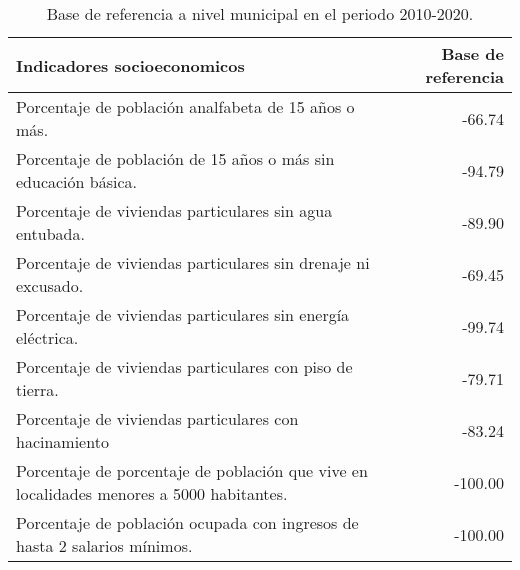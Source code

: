 \begin{table}[H]
    \changefontsizes{9pt}
    \centering
    \begin{tabular}{lr} \hline
        Indicadores socioeconomicos                                                              & Base de referencia \\  \hline
        Porcentaje de población analfabeta de 15 años o más.                                     & -66.74             \\
        Porcentaje de población de 15 años o más sin educación básica.                           & -94.79             \\
        Porcentaje de viviendas particulares sin agua entubada.                                  & -89.90             \\
        Porcentaje de viviendas particulares sin drenaje ni excusado.                            & -69.45             \\
        Porcentaje de viviendas particulares sin energía eléctrica.                              & -99.74             \\
        Porcentaje de viviendas particulares con piso de tierra.                                 & -79.71             \\
        Porcentaje de viviendas particulares con hacinamiento                                    & -83.24             \\
        Porcentaje de porcentaje de población que vive en localidades menores a 5000 habitantes. & -100.00            \\
        Porcentaje de población ocupada con ingresos de hasta 2 salarios mínimos.                & -100.00            \\ \hline
    \end{tabular}
    \normalsize
    \caption{Base de referencia a nivel municipal en el periodo 2010-2020.}
    \label{table:base_de_referencia}
\end{table}